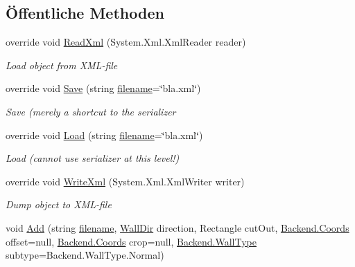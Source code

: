 \subsection*{Öffentliche Methoden}
\begin{DoxyCompactItemize}
\item 
override void \hyperlink{class_gruppe22_1_1_client_1_1_wall_tiles_a35922f5c31bb32c29a727d9187e2f85c}{Read\-Xml} (System.\-Xml.\-Xml\-Reader reader)
\begin{DoxyCompactList}\small\item\em Load object from X\-M\-L-\/file \end{DoxyCompactList}\item 
override void \hyperlink{class_gruppe22_1_1_client_1_1_wall_tiles_a77d2b127517f1909887add1f1a0349fd}{Save} (string \hyperlink{class_gruppe22_1_1_client_1_1_tile_set_afce49a3941b2d4a360990f9847282da1}{filename}=\char`\"{}bla.\-xml\char`\"{})
\begin{DoxyCompactList}\small\item\em Save (merely a shortcut to the serializer \end{DoxyCompactList}\item 
override void \hyperlink{class_gruppe22_1_1_client_1_1_wall_tiles_a3d27e943af070ad84e8764e96b5dbb0b}{Load} (string \hyperlink{class_gruppe22_1_1_client_1_1_tile_set_afce49a3941b2d4a360990f9847282da1}{filename}=\char`\"{}bla.\-xml\char`\"{})
\begin{DoxyCompactList}\small\item\em Load (cannot use serializer at this level!) \end{DoxyCompactList}\item 
override void \hyperlink{class_gruppe22_1_1_client_1_1_wall_tiles_a1298b94da55c6c2d82306396bef59cb1}{Write\-Xml} (System.\-Xml.\-Xml\-Writer writer)
\begin{DoxyCompactList}\small\item\em Dump object to X\-M\-L-\/file \end{DoxyCompactList}\item 
void \hyperlink{class_gruppe22_1_1_client_1_1_wall_tiles_ac5323eb3eee2446f8613be9c18418751}{Add} (string \hyperlink{class_gruppe22_1_1_client_1_1_tile_set_afce49a3941b2d4a360990f9847282da1}{filename}, \hyperlink{namespace_gruppe22_1_1_client_aa675883495b38ce0697938ab6300d990}{Wall\-Dir} direction, Rectangle cut\-Out, \hyperlink{class_gruppe22_1_1_backend_1_1_coords}{Backend.\-Coords} offset=null, \hyperlink{class_gruppe22_1_1_backend_1_1_coords}{Backend.\-Coords} crop=null, \hyperlink{namespace_gruppe22_1_1_backend_ab19de7e2856537f39fbd380beea6ddba}{Backend.\-Wall\-Type} subtype=Backend.\-Wall\-Type.\-Normal)

\end{DoxyCompactItemize}
